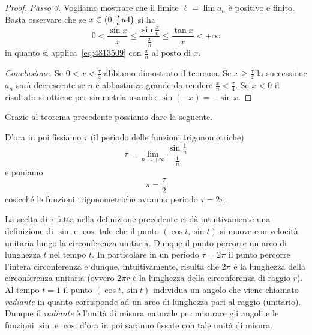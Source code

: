 \begin{proof}
\emph{Passo 3.}
Vogliamo mostrare che il limite $\ell=\lim a_n$ è positivo e 
finito.
Basta osservare che se $x\in\left(0,\frac tau 4\right)$
si ha
\[
0 < \frac{\sin x}{x} 
\le \frac{\sin \frac x n}{\frac x n} 
\le \frac{\tan x}{x} < +\infty
\]
in quanto si applica~\eqref{eq:4813509} 
con $\frac x n$ al posto di $x$. 

\emph{Conclusione.}
Se $0<x<\frac \tau 4$ abbiamo dimostrato il teorema.
Se $x\ge \frac \tau 4$ la successione $a_n$ sarà decrescente 
se $n$ è abbastanza grande da rendere $\frac x n< \frac \tau 4$.
Se $x<0$ il risultato si ottiene per simmetria usando: $\sin(-x)=-\sin x$.
\end{proof}

Grazie al teorema precedente possiamo dare la seguente.
\begin{definition}%
  \label{def:pi}%
D'ora in poi fissiamo $\tau$ 
(il periodo delle funzioni trigonometriche)
\[
 \tau = \lim_{n\to +\infty} \frac{\sin \frac 1 n}{\frac 1 n}
\]
e poniamo 
\[
  \pi = \frac \tau 2
\]
cosicché le funzioni trigonometriche avranno 
periodo $\tau = 2\pi$.
\end{definition}

La scelta di $\tau$ fatta nella definizione precedente 
ci dà intuitivamente una definizione di $\sin$ e $\cos$ tale 
che il punto $(\cos t,\sin t)$ si muove con velocità unitaria lungo 
la circonferenza unitaria. 
Dunque il punto percorre un arco di lunghezza $t$ nel tempo $t$.
In particolare in un periodo $\tau=2\pi$ il punto percorre l'intera 
circonferenza e dunque, intuitivamente, risulta che $2\pi$ è la lunghezza 
della circonferenza unitaria (ovvero $2\pi r$ è la lunghezza della circonferenza 
di raggio $r$).
Al tempo $t=1$ il punto $(\cos t,\sin t)$ individua un angolo che 
viene chiamato \emph{radiante} in quanto corrisponde ad un arco di lunghezza 
pari al raggio (unitario). 
Dunque il \emph{radiante} è l'unità di misura naturale per misurare gli angoli 
e le funzioni $\sin$ e $\cos$ d'ora in poi saranno fissate con tale unità di misura.

